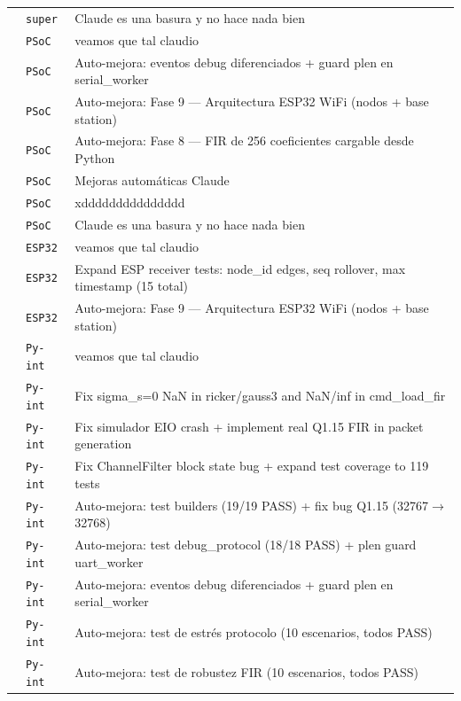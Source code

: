 \begin{longtable}{@{}p{1.7cm} p{1.5cm} p{12.2cm}@{}}
 & \texttt{\scriptsize super} & Claude es una basura y no hace nada bien \\
 & \texttt{\scriptsize PSoC} & veamos que tal claudio \\
 & \texttt{\scriptsize PSoC} & Auto-mejora: eventos debug diferenciados + guard plen en serial\_worker \\
 & \texttt{\scriptsize PSoC} & Auto-mejora: Fase 9 --- Arquitectura ESP32 WiFi (nodos + base station) \\
 & \texttt{\scriptsize PSoC} & Auto-mejora: Fase 8 --- FIR de 256 coeficientes cargable desde Python \\
 & \texttt{\scriptsize PSoC} & Mejoras automáticas Claude \\
 & \texttt{\scriptsize PSoC} & xddddddddddddddd \\
 & \texttt{\scriptsize PSoC} & Claude es una basura y no hace nada bien \\
 & \texttt{\scriptsize ESP32} & veamos que tal claudio \\
 & \texttt{\scriptsize ESP32} & Expand ESP receiver tests: node\_id edges, seq rollover, max timestamp (15 total) \\
 & \texttt{\scriptsize ESP32} & Auto-mejora: Fase 9 --- Arquitectura ESP32 WiFi (nodos + base station) \\
 & \texttt{\scriptsize Py-int} & veamos que tal claudio \\
 & \texttt{\scriptsize Py-int} & Fix sigma\_s=0 NaN in ricker/gauss3 and NaN/inf in cmd\_load\_fir \\
 & \texttt{\scriptsize Py-int} & Fix simulador EIO crash + implement real Q1.15 FIR in packet generation \\
 & \texttt{\scriptsize Py-int} & Fix ChannelFilter block state bug + expand test coverage to 119 tests \\
 & \texttt{\scriptsize Py-int} & Auto-mejora: test builders (19/19 PASS) + fix bug Q1.15 (32767$\rightarrow$32768) \\
 & \texttt{\scriptsize Py-int} & Auto-mejora: test debug\_protocol (18/18 PASS) + plen guard uart\_worker \\
 & \texttt{\scriptsize Py-int} & Auto-mejora: eventos debug diferenciados + guard plen en serial\_worker \\
 & \texttt{\scriptsize Py-int} & Auto-mejora: test de estrés protocolo (10 escenarios, todos PASS) \\
 & \texttt{\scriptsize Py-int} & Auto-mejora: test de robustez FIR (10 escenarios, todos PASS) \\

\end{longtable}
